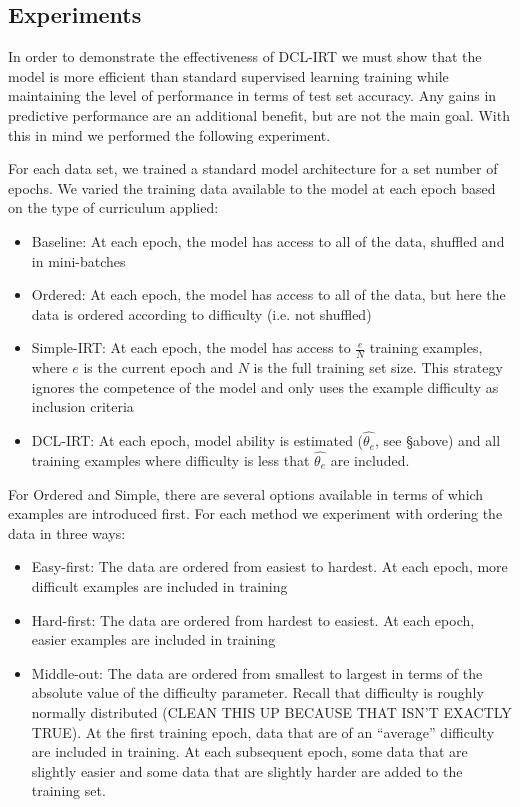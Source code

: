 \documentclass[letterpaper]{article} %
\begin{document}
\subsection{Experiments} 

In order to demonstrate the effectiveness of DCL-IRT we must show that the model is more efficient than standard supervised learning training while maintaining the level of performance in terms of test set accuracy. 
Any gains in predictive performance are an additional benefit, but are not the main goal.
With this in mind we performed the following experiment.

For each data set, we trained a standard model architecture for a set number of epochs. 
We varied the training data available to the model at each epoch based on the type of curriculum applied:

\begin{itemize}
	\item 
	Baseline: At each epoch, the model has access to all of the data, shuffled and in mini-batches
	\item 
	Ordered: At each epoch, the model has access to all of the data, but here the data is ordered according to difficulty (i.e. not shuffled) 
	\item 
	Simple-IRT: At each epoch, the model has access to $\frac{e}{N}$ training examples, where $e$ is the current epoch and $N$ is the full training set size. 
	This strategy ignores the competence of the model and only uses the example difficulty as inclusion criteria
	\item 
	DCL-IRT: At each epoch, model ability is estimated ($\hat{\theta_e}$, see \S above) and all training examples where difficulty is less that $\hat{\theta_e}$ are included.
\end{itemize}

For Ordered and Simple, there are several options available in terms of which examples are introduced first.
For each method we experiment with ordering the data in three ways:
\begin{itemize}
	\item 
	Easy-first: The data are ordered from easiest to hardest. At each epoch, more difficult examples are included in training
	\item 
	Hard-first: The data are ordered from hardest to easiest. At each epoch, easier examples are included in training
	\item 
	Middle-out: The data are ordered from smallest to largest in terms of the absolute value of the difficulty parameter. Recall that difficulty is roughly normally distributed (CLEAN THIS UP BECAUSE THAT ISN'T EXACTLY TRUE). At the first training epoch, data that are of an ``average'' difficulty are included in training. At each subsequent epoch, some data that are slightly easier and some data that are slightly harder are added to the training set.
\end{itemize}
\end{document}
